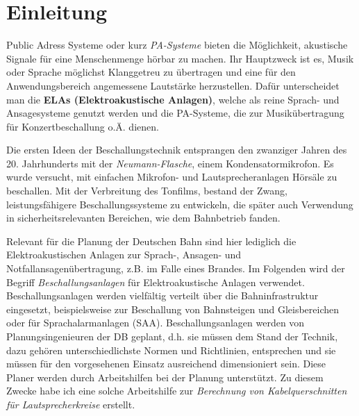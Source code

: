 \chapter{Einleitung}
\label{cha:Einleitung}
Public Adress Systeme oder kurz \textit{PA-Systeme} bieten die Möglichkeit, akustische Signale für eine Menschenmenge hörbar zu machen. Ihr Hauptzweck ist es, Musik oder Sprache möglichst Klanggetreu zu übertragen und eine für den Anwendungsbereich angemessene Lautstärke herzustellen. Dafür unterscheidet man die \textbf{ELAs (Elektroakustische Anlagen)}, welche als reine Sprach- und Ansagesysteme genutzt werden und die PA-Systeme, die zur Musikübertragung für Konzertbeschallung o.Ä. dienen. 

Die ersten Ideen der Beschallungstechnik entsprangen den zwanziger Jahren des 20. Jahrhunderts mit der \textit{Neumann-Flasche}, einem Kondensatormikrofon. Es wurde versucht, mit einfachen Mikrofon- und Lautsprecheranlagen Hörsäle zu beschallen. Mit der Verbreitung des Tonfilms, bestand der Zwang, leistungsfähigere Beschallungssysteme zu entwickeln, die später auch Verwendung in sicherheitsrelevanten Bereichen, wie dem Bahnbetrieb fanden.

Relevant für die Planung der Deutschen Bahn sind hier lediglich die Elektroakustischen Anlagen zur Sprach-, Ansagen- und Notfallansagenübertragung, z.B. im Falle eines Brandes. Im Folgenden wird der Begriff \textit{Beschallungsanlagen} für Elektroakustische Anlagen verwendet. Beschallungsanlagen werden vielfältig verteilt über die Bahninfrastruktur eingesetzt, beispielsweise zur Beschallung von Bahnsteigen und Gleisbereichen oder für Sprachalarmanlagen (SAA).
Beschallungsanlagen werden von Planungsingenieuren der DB geplant, d.h. sie müssen dem Stand der Technik, dazu gehören unterschiedlichste Normen und Richtlinien, entsprechen und sie müssen für den vorgesehenen Einsatz ausreichend dimensioniert sein. Diese Planer werden durch Arbeitshilfen bei der Planung unterstützt. Zu diesem Zwecke habe ich eine solche Arbeitshilfe zur \textit{Berechnung von Kabelquerschnitten für Lautsprecherkreise} erstellt.